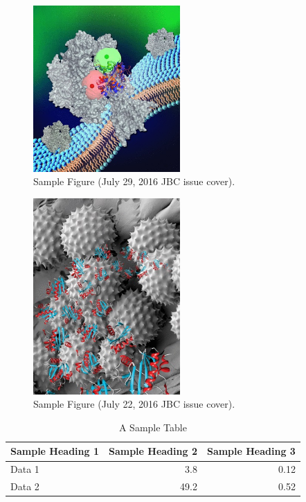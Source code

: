 \documentclass[alpha-refs]{wiley-article}
\begin{document}
\begin{figure}[hbtp!]\centering
\includegraphics[width=0.5\textwidth]{figures/jbc-cover-20160729.jpg}
\caption{Sample Figure (July 29, 2016 JBC issue cover).}
\label{fig:july29cover}
\end{figure}

\begin{figure}[hbtp!]\centering
\includegraphics[width=0.5\textwidth]{figures/jbc-cover-20160722.jpg}
\caption{Sample Figure (July 22, 2016 JBC issue cover).}
\label{fig:july22cover}
\end{figure}

\begin{table}[hp!]\centering
\begin{tabular}{l r r}
Sample Heading 1 & Sample Heading 2 & Sample Heading 3\\
\hline
Data 1 & 3.8 & 0.12 \\
Data 2 & 49.2 & 0.52
\end{tabular}
\caption{A Sample Table}
\label{tab:sample}
\end{table}
\end{document}
